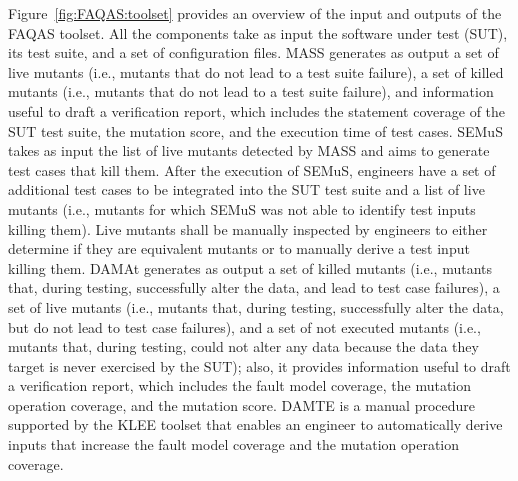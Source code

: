 Figure~\ref{fig:FAQAS:toolset} provides an overview of the input and outputs of the FAQAS toolset. All the components take as input the software under test (SUT), its test suite, and a set of configuration files. 
MASS generates as output a set of live mutants (i.e., mutants that do not lead to a test suite failure), a set of killed mutants (i.e., mutants that do not lead to a test suite failure), and information useful to draft a verification report, which includes the statement coverage of the SUT test suite, the mutation score, and the execution time of test cases.
SEMuS takes as input the list of live mutants detected by MASS and aims to generate test cases that kill them. After the
 execution of SEMuS, engineers have a set of additional test cases to be integrated into the SUT test suite and a list of live mutants (i.e., mutants for which SEMuS was not able to identify test inputs killing them). Live mutants shall be manually inspected by engineers to either determine if they are equivalent mutants or to manually derive a test input killing them.
 DAMAt generates as output a set of killed mutants (i.e., mutants that, during testing, successfully alter the data, and lead to test case failures), a set of live mutants (i.e., mutants that, during testing, successfully alter the data, but do not lead to test case failures), and a set of not executed mutants (i.e., mutants that, during testing, could not alter any data because the data they target is never exercised by the SUT); also, it provides information useful to draft a verification report, which includes the fault model coverage, the mutation operation coverage, and the mutation score.
 DAMTE is a manual procedure supported by the KLEE toolset that enables an engineer to automatically derive inputs that increase the fault model coverage and the mutation operation coverage.
